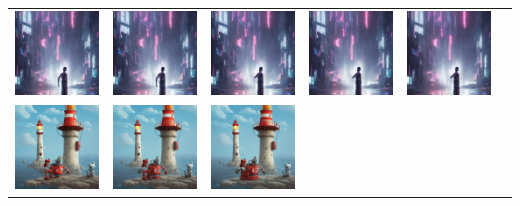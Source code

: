 \begin{table}[!htb]
\begin{tabular}{c c@{}c@{}c@{}c@{}c}
    \includegraphics[width=0.155\linewidth]{chapter/appendix/def_imgs/cyberpunk2/c2_10.png} &
    \includegraphics[width=0.155\linewidth]{chapter/appendix/def_imgs/cyberpunk2/c2_20.png} &
    \includegraphics[width=0.155\linewidth]{chapter/appendix/def_imgs/cyberpunk2/c2_30.png} &
    \includegraphics[width=0.155\linewidth]{chapter/appendix/def_imgs/cyberpunk2/c2_40.png} &
    \includegraphics[width=0.155\linewidth]{chapter/appendix/def_imgs/cyberpunk2/c2_50.png} \\
    \includegraphics[width=0.155\linewidth]{chapter/appendix/def_imgs/lighthouse/l_0.png} & 
    \includegraphics[width=0.155\linewidth]{chapter/appendix/def_imgs/lighthouse/l_10.png} &
    \includegraphics[width=0.155\linewidth]{chapter/appendix/def_imgs/lighthouse/l_20.png} &

\end{tabular}
\end{table}

